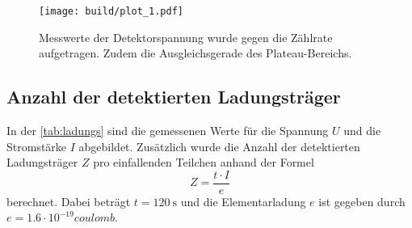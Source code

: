 \begin{figure}[H]
	\texttt{[image: build/plot\_1.pdf]}
	\caption{Messwerte der Detektorspannung wurde gegen die Zählrate aufgetragen. Zudem die Ausgleichsgerade des Plateau-Bereichs.}
	\label{fig:plot_1}
\end{figure}

\subsection{Anzahl der detektierten Ladungsträger}
\label{sec:Anzahl der detektierten Ladungsträger}

In der \autoref{tab:ladungs} sind die gemessenen Werte für die  Spannung $U$ und die Stromstärke $I$ abgebildet.
Zusätzlich wurde die Anzahl der detektierten Ladungsträger $Z$ pro einfallenden Teilchen anhand der Formel
\begin{equation*}
    Z = \frac{t \cdot I}{e}
\end{equation*}
berechnet. Dabei beträgt $t = \SI{120}{\second}$ und die Elementarladung $e$ ist gegeben durch $e = 1.6 \cdot 10^{-19} \si{coulomb}$.

